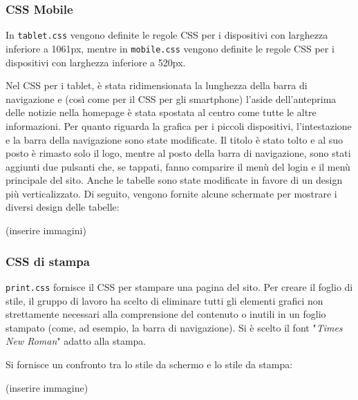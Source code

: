 \documentclass[12pt, a4paper]{article}
\begin{document}
\subsubsection{CSS Mobile}
In \texttt{tablet.css} vengono definite le regole CSS per i dispositivi con larghezza inferiore a 1061px, mentre in \texttt{mobile.css} vengono definite le regole CSS per i dispositivi con larghezza inferiore a 520px.\par
Nel CSS per i tablet, è stata ridimensionata la lunghezza della barra di navigazione e (così come per il CSS per gli smartphone) l'aside dell'anteprima delle notizie nella homepage è stata spostata al centro come tutte le altre informazioni.
Per quanto riguarda la grafica per i piccoli dispositivi, l'intestazione e la barra della navigazione sono state modificate. Il titolo è stato tolto e al suo posto è rimasto solo il logo, mentre al posto della barra di navigazione, sono stati aggiunti due pulsanti che, se tappati, fanno comparire il menù del login e il menù principale del sito.
Anche le tabelle sono state modificate in favore di un design più verticalizzato. Di seguito, vengono fornite alcune schermate per mostrare i diversi design delle tabelle:

(inserire immagini)

\subsubsection{CSS di stampa}
\texttt{print.css} fornisce il CSS per stampare una pagina del sito. Per creare il foglio di stile, il gruppo di lavoro ha scelto di eliminare tutti gli elementi grafici non strettamente necessari alla comprensione del contenuto o inutili in un foglio stampato (come, ad esempio, la barra di navigazione). Si è scelto il font "\textit{Times New Roman}" adatto alla stampa.\par
Si fornisce un confronto tra lo stile da schermo e lo stile da stampa:

(inserire immagine)
\end{document}
